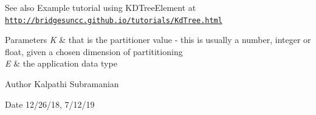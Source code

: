 \begin{DoxySeeAlso}{See also}
Example tutorial using K\+D\+Tree\+Element at \href{http://bridgesuncc.github.io/tutorials/KdTree.html}{\tt http\+://bridgesuncc.\+github.\+io/tutorials/\+Kd\+Tree.\+html}
\end{DoxySeeAlso}

\begin{DoxyParams}{Parameters}
{\em K} & that is the partitioner value -\/ this is usually a number, integer or float, given a chosen dimension of partititioning \\
\hline
{\em E} & the application data type\\
\hline
\end{DoxyParams}
\begin{DoxyAuthor}{Author}
Kalpathi Subramanian 
\end{DoxyAuthor}
\begin{DoxyDate}{Date}
12/26/18, 7/12/19 
\end{DoxyDate}
